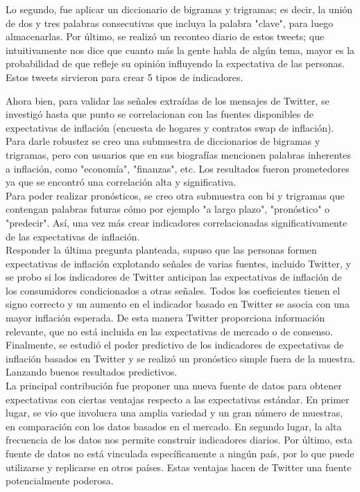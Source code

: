 Lo segundo, fue aplicar un diccionario de bigramas y trigramas; es decir, la unión de dos y tres palabras consecutivas que incluya la palabra "clave", para luego almacenarlas. Por último, se realizó un reconteo diario de estos tweets; que intuitivamente nos dice que cuanto más la gente habla de algún tema, mayor es la probabilidad de que refleje su opinión influyendo la expectativa de las personas. Estos tweets sirvieron para crear 5 tipos de indicadores.  

Ahora bien, para validar las señales extraídas de los mensajes de Twitter, se investigó hasta que punto se correlacionan con las fuentes disponibles de expectativas de inflación (encuesta de hogares y contratos swap de inflación). Para darle robustez se creo una submuestra de diccionarios de bigramas y trigramas, pero con usuarios que en sus biografías mencionen palabras inherentes a inflación, como "economía", "finanzas", etc. Los resultados fueron prometedores ya que se encontró una correlación alta y significativa.\\

Para poder realizar pronósticos, se creo otra submuestra con bi y trigramas que contengan palabras futuras cómo por ejemplo "a largo plazo", "pronóstico" o "predecir". Así, una vez más crear indicadores correlacionadas significativamente de las expectativas de inflación.\\ 

Responder la última pregunta planteada, supuso que las personas formen expectativas de inflación explotando señales de varias fuentes, incluido Twitter, y se probo si los indicadores de Twitter anticipan las expectativas de inflación de los consumidores condicionados a otras señales. Todos los coeficientes tienen el signo correcto y un aumento en el indicador basado en Twitter se asocia con una mayor inflación esperada. De esta manera Twitter proporciona información relevante, que no está incluida en las expectativas de mercado o de consenso.\\

Finalmente, se estudió el poder predictivo de los indicadores de expectativas de inflación basados en Twitter y se realizó un pronóstico simple fuera de la muestra. Lanzando buenos resultados predictivos.\\

La principal contribución fue proponer una nueva fuente de datos para obtener expectativas con ciertas ventajas respecto a las expectativas estándar. En primer lugar, se vio que involucra una amplia variedad y un gran número de muestras, en comparación con los datos basados en el mercado. En segundo lugar, la alta frecuencia de los datos nos permite construir indicadores diarios. Por último, esta fuente de datos no está vinculada específicamente a ningún país, por lo que puede utilizarse y replicarse en otros países. Estas ventajas hacen de Twitter una fuente potencialmente poderosa.
